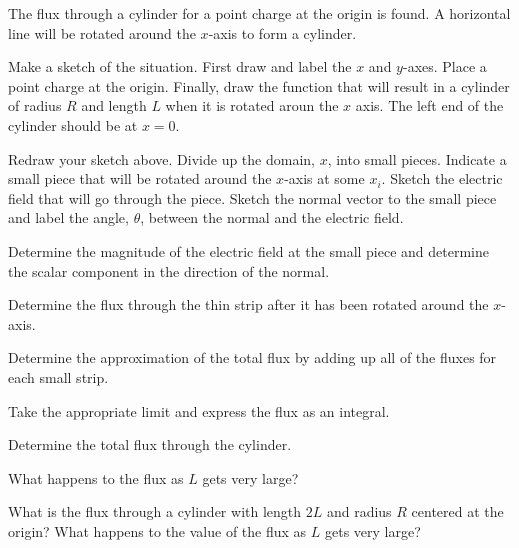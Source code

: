 

\begin{problem}
\item The flux through a cylinder for a point charge at the origin is found.
A horizontal line will be rotated around the $x$-axis to form a cylinder.
  \begin{subproblem}
    \item Make a sketch of the situation. First draw and label the $x$ and $y$-axes.
    Place a point charge at the origin.
    Finally, draw the function that will result in a cylinder of radius $R$ and length $L$ when it is rotated aroun the $x$ axis.
    The left end of the cylinder should be at $x=0$.
    \vfill

    \item Redraw your sketch above. Divide up the domain, $x$, into small pieces.
    Indicate a small piece that will be rotated around the $x$-axis at some $x_i$.
    Sketch the electric field that will go through the piece.
    Sketch the normal vector to the small piece and label the angle, $\theta$, between the normal and the electric field.
    \vfill

    \item  Determine the magnitude of the  electric field at the small piece and determine the scalar component in the direction of the normal.
    \vfill

    \clearpage

    \item Determine the flux through the thin strip after it has been rotated around the $x$-axis.
      \vfill

    \item Determine the approximation of the total flux by adding up all of the fluxes for each small strip.
      \vfill

    \item Take the appropriate limit and express the flux as an integral.
      \vfill

    \item Determine the total flux through the cylinder.
      \vfill

    \clearpage

    \item What happens to the flux as $L$ gets very large?
      \vspace{6em}

    \item What is the flux through a cylinder with length $2L$ and radius $R$ centered at the origin? What happens to the value of the flux as $L$ gets very large?
      \vfill

  \end{subproblem}
\end{problem}


